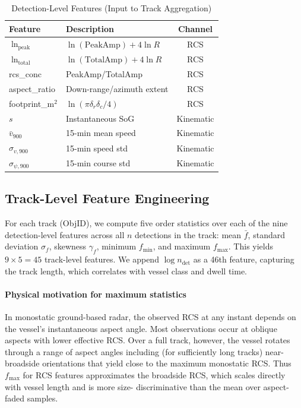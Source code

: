 \documentclass[10pt,journal,compsoc]{IEEEtran}
\begin{document}
\begin{table}[!t]
\centering\small
\caption{Detection-Level Features (Input to Track Aggregation)}
\label{tab:features}
\begin{tabular}{llc}
\toprule
Feature & Description & Channel \\
\midrule
$\ln_\text{peak}$ & $\ln(\text{PeakAmp})+4\ln R$ & RCS \\
$\ln_\text{total}$ & $\ln(\text{TotalAmp})+4\ln R$ & RCS \\
rcs\_conc & PeakAmp/TotalAmp & RCS \\
aspect\_ratio & Down-range/azimuth extent & RCS \\
footprint\_m$^2$ & $\ln(\pi\delta_r\delta_c/4)$ & RCS \\
$s$ & Instantaneous SoG & Kinematic \\
$\bar{v}_{900}$ & 15-min mean speed & Kinematic \\
$\sigma_{v,900}$ & 15-min speed std & Kinematic \\
$\sigma_{\psi,900}$ & 15-min course std & Kinematic \\
\bottomrule
\end{tabular}
\end{table}

\subsection{Track-Level Feature Engineering}

For each track (ObjID), we compute five order statistics over each of the
nine detection-level features across all $n$ detections in the track:
mean $\bar{f}$, standard deviation $\sigma_f$, skewness $\gamma_f$,
minimum $f_{\min}$, and maximum $f_{\max}$.  This yields $9 \times 5 = 45$
track-level features.  We append $\log n_{\mathrm{det}}$ as a 46th feature,
capturing the track length, which correlates with vessel class and dwell time.

\paragraph{Physical motivation for maximum statistics}
In monostatic ground-based radar, the observed RCS at any instant depends
on the vessel's instantaneous aspect angle.  Most observations occur at
oblique aspects with lower effective RCS.  Over a full track, however, the
vessel rotates through a range of aspect angles including (for sufficiently
long tracks) near-broadside orientations that yield close to the maximum
monostatic RCS.  Thus $f_{\max}$ for RCS features approximates the
broadside RCS, which scales directly with vessel length and is more size-
discriminative than the mean over aspect-faded samples.
\end{document}
